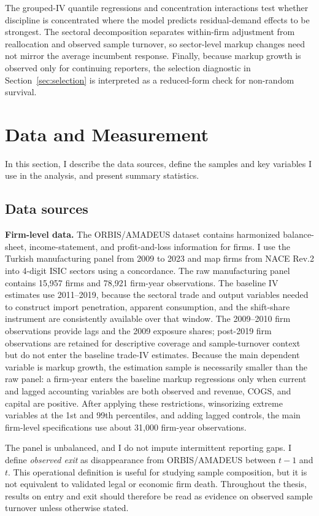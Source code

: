 ﻿\documentclass[12pt]{article}
\begin{document}
The grouped-IV quantile regressions and concentration interactions test whether discipline is concentrated where the model predicts residual-demand effects to be strongest. The sectoral decomposition separates within-firm adjustment from reallocation and observed sample turnover, so sector-level markup changes need not mirror the average incumbent response. Finally, because markup growth is observed only for continuing reporters, the selection diagnostic in Section~\ref{sec:selection} is interpreted as a reduced-form check for non-random survival.

\section{Data and Measurement}
In this section, I describe the data sources, define the samples and key variables I use in the analysis, and present summary statistics.

\subsection{Data sources}
\textbf{Firm-level data.} The ORBIS/AMADEUS dataset contains harmonized balance-sheet, income-statement, and profit-and-loss information for firms. I use the Turkish manufacturing panel from 2009 to 2023 and map firms from NACE Rev.2 into 4-digit ISIC sectors using a concordance. The raw manufacturing panel contains 15,957 firms and 78,921 firm-year observations. The baseline IV estimates use 2011--2019, because the sectoral trade and output variables needed to construct import penetration, apparent consumption, and the shift-share instrument are consistently available over that window. The 2009--2010 firm observations provide lags and the 2009 exposure shares; post-2019 firm observations are retained for descriptive coverage and sample-turnover context but do not enter the baseline trade-IV estimates. Because the main dependent variable is markup growth, the estimation sample is necessarily smaller than the raw panel: a firm-year enters the baseline markup regressions only when current and lagged accounting variables are both observed and revenue, COGS, and capital are positive. After applying these restrictions, winsorizing extreme variables at the 1st and 99th percentiles, and adding lagged controls, the main firm-level specifications use about 31,000 firm-year observations.

The panel is unbalanced, and I do not impute intermittent reporting gaps. I define \emph{observed exit} as disappearance from ORBIS/AMADEUS between $t-1$ and $t$. This operational definition is useful for studying sample composition, but it is not equivalent to validated legal or economic firm death. Throughout the thesis, results on entry and exit should therefore be read as evidence on observed sample turnover unless otherwise stated.
\end{document}
